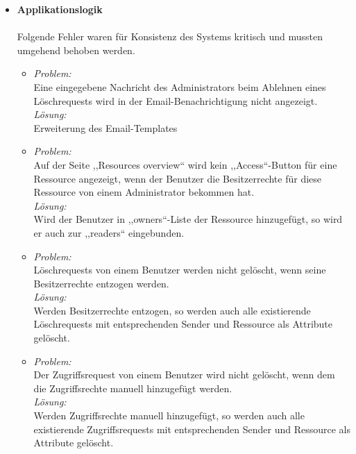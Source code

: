 \documentclass[parskip=full,11pt]{scrartcl}
\begin{document}
\renewcommand{\labelitemii}{$\bullet$}
\begin{itemize}
\item[] \textbf{Applikationslogik}\\\\
Folgende Fehler waren für Konsistenz des Systems kritisch und mussten umgehend behoben werden.
	\begin{itemize}
		\item \textit{Problem:}\\ Eine eingegebene Nachricht des Administrators beim Ablehnen eines Löschrequests wird in der Email-Benachrichtigung  nicht angezeigt.\\
			\textit{Lösung:}\\ Erweiterung des Email-Templates
		\item \textit{Problem:} \\Auf der Seite ,,Resources overview`` wird kein ,,Access``-Button für eine Ressource  angezeigt, wenn der Benutzer die Besitzerrechte für diese Ressource von einem Administrator bekommen hat.\\
		\textit{Lösung:} \\Wird der Benutzer in ,,owners``-Liste der Ressource hinzugefügt, so wird er auch zur ,,readers`` eingebunden.
		
		\item \textit{Problem:}\\
		Löschrequests von einem Benutzer werden nicht gelöscht, wenn seine Besitzerrechte entzogen werden.\\
		\textit{Lösung:}\\
		Werden Besitzerrechte entzogen, so werden auch alle existierende Löschrequests mit entsprechenden Sender und Ressource als Attribute gelöscht.
		\item \textit{Problem:}\\
		Der Zugriffsrequest von einem Benutzer wird nicht gelöscht, wenn dem die Zugriffsrechte manuell hinzugefügt werden.\\
		\textit{Lösung:}\\
		Werden Zugriffsrechte manuell hinzugefügt, so werden auch alle existierende Zugriffsrequests mit entsprechenden Sender und Ressource als Attribute gelöscht.
	\end{itemize}


\end{itemize}
\end{document}
